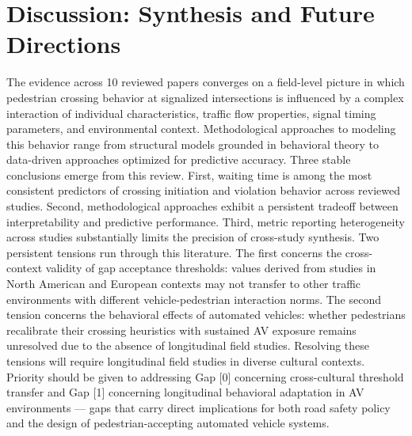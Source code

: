 \documentclass{article}
\begin{document}
\section{Discussion: Synthesis and Future Directions}
The evidence across 10 reviewed papers converges on a field-level picture in which pedestrian crossing behavior at signalized intersections is influenced by a complex interaction of individual characteristics, traffic flow properties, signal timing parameters, and environmental context. Methodological approaches to modeling this behavior range from structural models grounded in behavioral theory to data-driven approaches optimized for predictive accuracy. Three stable conclusions emerge from this review. First, waiting time is among the most consistent predictors of crossing initiation and violation behavior across reviewed studies. Second, methodological approaches exhibit a persistent tradeoff between interpretability and predictive performance. Third, metric reporting heterogeneity across studies substantially limits the precision of cross-study synthesis. Two persistent tensions run through this literature. The first concerns the cross-context validity of gap acceptance thresholds: values derived from studies in North American and European contexts may not transfer to other traffic environments with different vehicle-pedestrian interaction norms. The second tension concerns the behavioral effects of automated vehicles: whether pedestrians recalibrate their crossing heuristics with sustained AV exposure remains unresolved due to the absence of longitudinal field studies. Resolving these tensions will require longitudinal field studies in diverse cultural contexts. Priority should be given to addressing Gap [0] concerning cross-cultural threshold transfer and Gap [1] concerning longitudinal behavioral adaptation in AV environments — gaps that carry direct implications for both road safety policy and the design of pedestrian-accepting automated vehicle systems.
\end{document}
